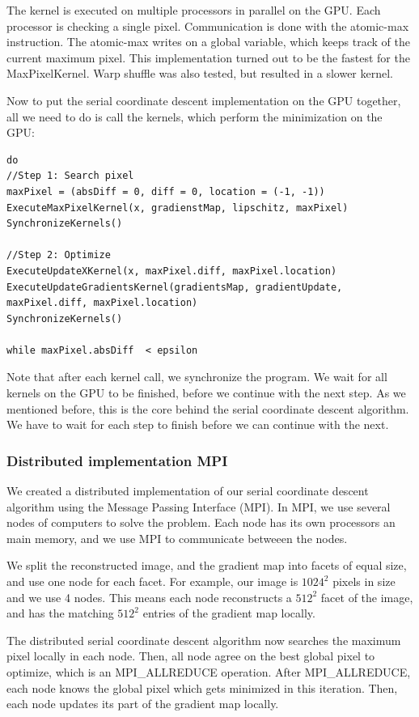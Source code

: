 The kernel is executed on multiple processors in parallel on the GPU. Each processor is checking a single pixel. Communication is done with the atomic-max instruction. The atomic-max writes on a global variable, which keeps track of the current maximum pixel. This implementation turned out to be the fastest for the MaxPixelKernel. Warp shuffle\cite{keplerShuffle} was also tested, but resulted in a slower kernel.

Now to put the serial coordinate descent implementation on the GPU together, all we need to do is call the kernels, which perform the minimization on the GPU:


\begin{lstlisting}
do 
//Step 1: Search pixel
maxPixel = (absDiff = 0, diff = 0, location = (-1, -1))
ExecuteMaxPixelKernel(x, gradienstMap, lipschitz, maxPixel)
SynchronizeKernels()

//Step 2: Optimize
ExecuteUpdateXKernel(x, maxPixel.diff, maxPixel.location)
ExecuteUpdateGradientsKernel(gradientsMap, gradientUpdate, maxPixel.diff, maxPixel.location)
SynchronizeKernels()

while maxPixel.absDiff  < epsilon
\end{lstlisting}

Note that after each kernel call, we synchronize the program. We wait for all kernels on the GPU to be finished, before we continue with the next step. As we mentioned before, this is the core behind the serial coordinate descent algorithm. We have to wait for each step to finish before we can continue with the next. 


\subsubsection*{Distributed implementation MPI}
We created a distributed implementation of our serial coordinate descent algorithm using the Message Passing Interface (MPI). In MPI, we use several nodes of computers to solve the problem. Each node has its own processors an main memory, and we use MPI to communicate betweeen the nodes. 

We split the reconstructed image, and the gradient map into facets of equal size, and use one node for each facet. For example, our image is $1024^2$ pixels in size and we use 4 nodes. This means each node reconstructs a $512^2$ facet of the image, and has the matching $512^2$ entries of the gradient map locally. 

The distributed serial coordinate descent algorithm now searches the maximum pixel locally in each node. Then, all node agree on the best global pixel to optimize, which is an MPI\_ALLREDUCE operation. After MPI\_ALLREDUCE, each node knows the global pixel which gets minimized in this iteration. Then, each node updates its part of the gradient map locally.

